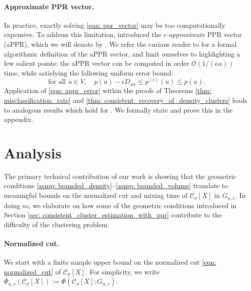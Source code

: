 \documentclass{article}
\newcommand{\1}{\mathbf{1}}
\newcommand{\pbf}{p}        %
\newcommand{\Xbf}{X}             %
\newcommand{\Dbf}{D}
\newcommand{\Cset}{\mathcal{C}}
\newcommand{\Csig}{\Cset_{\sigma}}
\theoremstyle{aldenthm}
\theoremstyle{aldenrmrk}
\begin{document}
\paragraph{Approximate PPR vector.}  In practice, exactly solving \eqref{eqn:
  ppr_vector} may be too computationally expensive. To address this limitation,
\citet{andersen2006} introduced the \emph{$\epsilon$-approximate} PPR vector
(aPPR), which we will denote by \smash{$\pbf^{(\epsilon)}$}. We refer the
curious reader to \citet{andersen2006} for a formal algorithmic definition of
the aPPR vector, and limit ourselves to highlighting a few salient points: the
aPPR vector can be computed in order $\mathcal{O}(1/(\epsilon\alpha))$ time,
while satisfying the following uniform error bound: 
\begin{equation}
\label{eqn: appr_error}
\textrm{for all $u \in V$}, \quad \pbf(u) - \epsilon \Dbf_{uu}\leq
\pbf^{(\epsilon)}(u) \leq \pbf(u).  
\end{equation}
Application of \eqref{eqn: appr_error} within the proofs of Theorems \ref{thm:
  misclassification_rate} and \ref{thm: consistent_recovery_of_density_clusters}
leads to analogous results which hold for \smash{$\pbf^{(\epsilon)}$}. We
formally state and prove this in the appendix. 

\section{Analysis}
\label{sec: analysis}

The primary technical contribution of our work is showing that the geometric
conditions \ref{asmp: bounded_density}--\ref{asmp: bounded_volume} translate to 
meaningful bounds on the normalized cut and mixing time of $\Csig[\Xbf]$ in
$G_{n,r}$. In doing so, we elaborate on how some of the geometric conditions
introduced in Section \ref{sec: consistent_cluster_estimation_with_ppr}
contribute to the difficulty of the clustering problem. 

\paragraph{Normalized cut.} We start with a finite sample upper bound on the
normalized cut \eqref{eqn: normalized_cut} of $\Cset_\sigma[\Xbf]$. For
simplicity, we write $\Phi_{n,r}(\Csig[\Xbf]) := \Phi(\Csig[\Xbf]; G_{n,r})$. 
\end{document}
